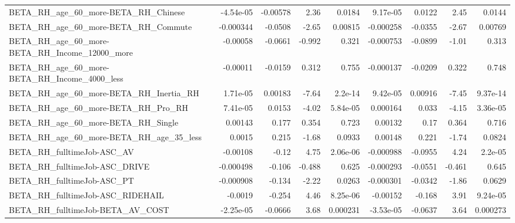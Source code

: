 \begin{tabular}{lrrrrrrrr}
BETA\_RH\_age\_60\_more-BETA\_RH\_Chinese                &   -4.54e-05 &     -0.00578 &     2.36 &   0.0184 &   9.17e-05 &      0.0122 &         2.45 &        0.0144 \\
BETA\_RH\_age\_60\_more-BETA\_RH\_Commute                &   -0.000344 &      -0.0508 &    -2.65 &  0.00815 &  -0.000258 &     -0.0355 &        -2.67 &       0.00769 \\
BETA\_RH\_age\_60\_more-BETA\_RH\_Income\_12000\_more      &    -0.00058 &      -0.0661 &   -0.992 &    0.321 &  -0.000753 &     -0.0899 &        -1.01 &         0.313 \\
BETA\_RH\_age\_60\_more-BETA\_RH\_Income\_4000\_less       &    -0.00011 &      -0.0159 &    0.312 &    0.755 &  -0.000137 &     -0.0209 &        0.322 &         0.748 \\
BETA\_RH\_age\_60\_more-BETA\_RH\_Inertia\_RH             &    1.71e-05 &      0.00183 &    -7.64 &  2.2e-14 &   9.42e-05 &     0.00916 &        -7.45 &      9.37e-14 \\
BETA\_RH\_age\_60\_more-BETA\_RH\_Pro\_RH                 &    7.41e-05 &       0.0153 &    -4.02 & 5.84e-05 &   0.000164 &       0.033 &        -4.15 &      3.36e-05 \\
BETA\_RH\_age\_60\_more-BETA\_RH\_Single                 &     0.00143 &        0.177 &    0.354 &    0.723 &    0.00132 &        0.17 &        0.364 &         0.716 \\
BETA\_RH\_age\_60\_more-BETA\_RH\_age\_35\_less            &      0.0015 &        0.215 &    -1.68 &   0.0933 &    0.00148 &       0.221 &        -1.74 &        0.0824 \\
BETA\_RH\_fulltimeJob-ASC\_AV                         &    -0.00108 &        -0.12 &     4.75 & 2.06e-06 &  -0.000988 &     -0.0955 &         4.24 &       2.2e-05 \\
BETA\_RH\_fulltimeJob-ASC\_DRIVE                      &   -0.000498 &       -0.106 &   -0.488 &    0.625 &  -0.000293 &     -0.0551 &       -0.461 &         0.645 \\
BETA\_RH\_fulltimeJob-ASC\_PT                         &   -0.000908 &       -0.134 &    -2.22 &   0.0263 &  -0.000301 &     -0.0342 &        -1.86 &        0.0629 \\
BETA\_RH\_fulltimeJob-ASC\_RIDEHAIL                   &     -0.0019 &       -0.254 &     4.46 & 8.25e-06 &   -0.00152 &      -0.168 &         3.91 &      9.24e-05 \\
BETA\_RH\_fulltimeJob-BETA\_AV\_COST                   &   -2.25e-05 &      -0.0666 &     3.68 & 0.000231 &  -3.53e-05 &     -0.0637 &         3.64 &      0.000273 \\

\end{tabular}
